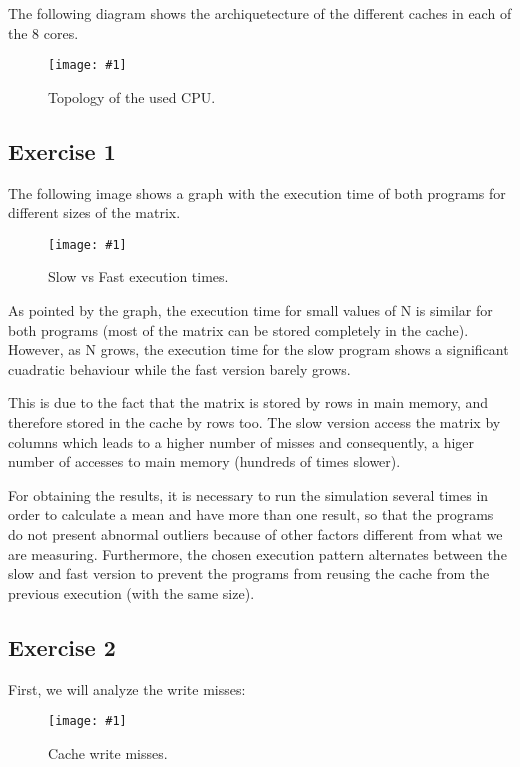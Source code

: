 \documentclass{article}
\newcommand{\myFigure}[4]{%
    \begin{figure}[!ht]
        \texttt{[image: \#1]}
        \centering
        \caption{#2}
        \label{#3}
    \end{figure}
}
\begin{document}
The following diagram shows the archiquetecture of the different caches in each of the 8 cores. 

\myFigure{../material_P3/out0/mv/figure.png}{Topology of the used CPU.}{topology}{0.34}

\pagebreak

\subsection*{Exercise 1}

The following image shows a graph with the execution time of both programs for different sizes of the matrix.

\myFigure{../material_P3/out1/mv_att4/slow_fast_time.png}{Slow vs Fast execution times.}{slow_fast_times}{0.65}

As pointed by the graph, the execution time for small values of N is similar for both programs (most of the matrix can be stored completely in the cache). However, as N grows, the execution time for the slow program shows a significant cuadratic behaviour while the fast version barely grows.

This is due to the fact that the matrix is stored by rows in main memory, and therefore stored in the cache by rows too. The slow version access the matrix by columns which leads to a higher number of misses and consequently, a higer number of accesses to main memory (hundreds of times slower). 

For obtaining the results, it is necessary to run the simulation several times in order to calculate a mean and have more than one result, so that the programs do not present abnormal outliers because of other factors different from what we are measuring. Furthermore, the chosen execution pattern alternates between the slow and fast version to prevent the programs from reusing the cache from the previous execution (with the same size).

\pagebreak

\subsection*{Exercise 2}

First, we will analyze the write misses: 

\myFigure{../material_P3/out2/mv_att1/cache_escritura.png}{Cache write misses.}{cache_escritura}{0.55}
\end{document}

